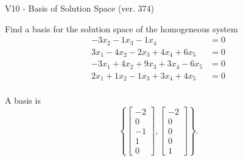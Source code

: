 \begin{exercise}
  \begin{exerciseTitle}V10 - Basis of Solution Space (ver. 374)\end{exerciseTitle}
  \begin{exerciseStatement}
    Find a basis for the solution space of the homogeneous system 
\begin{align*}
 -3 x_ 2 -1 x_ 3 -1 x_ 4 &= 0  \\ 
  3 x_ 1 -4 x_ 2 -2 x_ 3 + 4 x_ 4 + 6 x_ 5 &= 0  \\ 
  -3 x_ 1 + 4 x_ 2 + 9 x_ 3 + 3 x_ 4 -6 x_ 5 &= 0  \\ 
  2 x_ 1 + 1 x_ 2 -1 x_ 3 + 3 x_ 4 + 4 x_ 5 &= 0  \\ 
 \end{align*}


 
  \end{exerciseStatement}

  \begin{exerciseAnswer}
   A basis is   
\[\left\{\left[\begin{array}{c}
-2 \\
0 \\
-1 \\
1 \\
0
\end{array}\right] , \left[\begin{array}{c}
-2 \\
0 \\
0 \\
0 \\
1
\end{array}\right]\right\}.\]

  


  \end{exerciseAnswer}
\end{exercise}